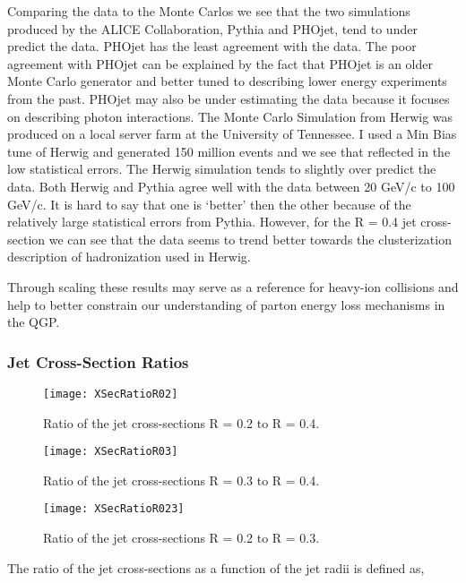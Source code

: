 Comparing the data to the Monte Carlos we see that the two simulations produced by the ALICE Collaboration, Pythia and PHOjet, tend to under predict the data.  PHOjet has the least agreement with the data.  The poor agreement with PHOjet can be explained by the fact that PHOjet is an older Monte Carlo generator and better tuned to describing lower energy experiments from the past.  PHOjet may also be under estimating the data because it focuses on describing photon interactions.  The Monte Carlo Simulation from Herwig was produced on a local server farm at the University of Tennessee.  I used a Min Bias tune of Herwig and generated 150 million events and we see that reflected in the low statistical errors.  The Herwig simulation tends to slightly over predict the data.  Both Herwig and Pythia agree well with the data between 20 GeV/c to 100 GeV/c.  It is hard to say that one is `better' then the other because of the relatively large statistical errors from Pythia.  However, for the R = 0.4 jet cross-section we can see that the data seems to trend better towards the clusterization description of hadronization used in Herwig.

Through scaling these results may serve as a reference for heavy-ion collisions and help to better constrain our understanding of parton energy loss mechanisms in the QGP.  


\subsubsection{Jet Cross-Section Ratios}

\begin{figure}[h]
\texttt{[image: XSecRatioR02]}
\centering
\caption{Ratio of the jet cross-sections R = 0.2  to R = 0.4.}
\label{fig:JetXsecRatioR02}
\end{figure}

\begin{figure}[h]
\texttt{[image: XSecRatioR03]}
\centering
\caption{Ratio of the jet cross-sections R = 0.3  to R = 0.4.}
\label{fig:JetXsecRatioR03}
\end{figure}


\begin{figure}[h]
\texttt{[image: XSecRatioR023]}
\centering
\caption{Ratio of the jet cross-sections R = 0.2  to R = 0.3.}
\label{fig:JetXsecRatioR023}
\end{figure}


\noindent
The ratio of the jet cross-sections as a function of the jet radii is defined as,

